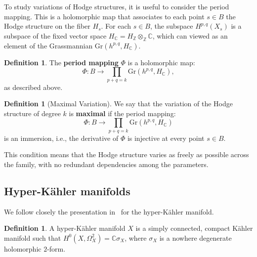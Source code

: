 \documentclass{article}
\theoremstyle{definition}
\newtheorem{definition}[theorem]{Definition}
\begin{document}
To study variations of Hodge structures, it is useful to consider the period mapping. This is a holomorphic map that associates to each point \( s \in B \) the Hodge structure on the fiber \( H_s \). For each $s \in B$, the subspace $H^{p, q}(X_s)$ is a subspace of the fixed vector space $H_\mathbb C = H_\mathbb Z\otimes_\mathbb Z \mathbb C$, which can viewed as an element of the Grassmannian $\mathrm{Gr}(h^{p, q}, H_\mathbb C)$.

\begin{definition}
The \textbf{period mapping} \( \Phi \) is a holomorphic map:
\[
\Phi: B \to \prod_{p+ q = k} \mathrm{Gr}(h^{p, q}, H_\mathbb C),
\]
as described above.
\end{definition}


\begin{definition}[Maximal Variation]
We say that the variation of the Hodge structure of degree \( k \) is \textbf{maximal} if the period mapping:
\[
\Phi: B \to \prod_{p+q=k} \mathrm{Gr}(h^{p,q}, H_\mathbb C)
\]
is an immersion, i.e., the derivative of \( \Phi \) is injective at every point \( s \in B \).
\end{definition}

This condition means that the Hodge structure varies as freely as possible across the family, with no redundant dependencies among the parameters.



\subsection{Hyper-Kähler manifolds}

We follow closely the presentation in~\cite{DebarreHK} for the hyper-Kähler manifold.

\begin{definition}
    A hyper-Kähler manifold $X$ is a simply connected, compact Kähler manifold such that $H^0(X, \Omega_X^2) = \mathbb C\sigma_X$, where $\sigma_X$ is a nowhere degenerate holomorphic $2$-form.
\end{definition}

\end{document}
